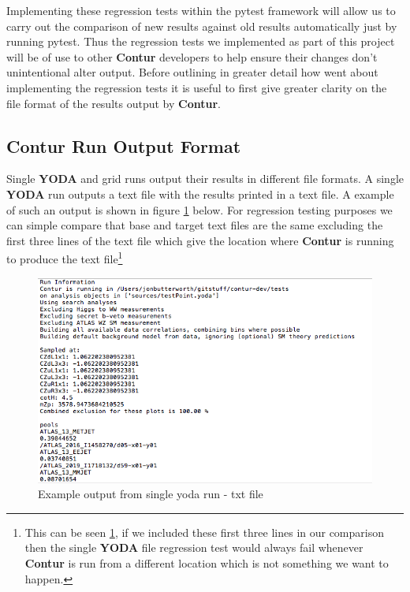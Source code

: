 Implementing these regression tests within the pytest framework will allow us to carry out the comparison of new results against old results automatically just by running pytest. Thus the regression tests we implemented as part of this project will be of use to other \textbf{Contur} developers to help ensure their changes don't unintentional alter output. Before outlining in greater detail how went about implementing the regression tests it is useful to first give greater clarity on the file format of the results output by \textbf{Contur}.

\subsection{Contur Run Output Format}
Single \textbf{YODA} and grid runs output their results in different file formats. A single \textbf{YODA} run outputs a text file with the results printed in a text file. A example of such an output is shown in figure \ref{fig:contur_txt_output} below. For regression testing purposes we can simple compare that base and target text files are the same excluding the first three lines of the text file which give the location where \textbf{Contur} is running to produce the text file\footnote{This can be seen \ref{fig:contur_txt_output}, if we included these first three lines in our comparison then the single \textbf{YODA} file regression test would always fail whenever \textbf{Contur} is run from a different location which is not something we want to happen.}

\begin{figure}[H]
\centering
\includegraphics[scale=0.6]{plots/single_yoda_run.png}
\caption{Example output from single yoda run - txt file}
\label{fig:contur_txt_output}
\end{figure}

